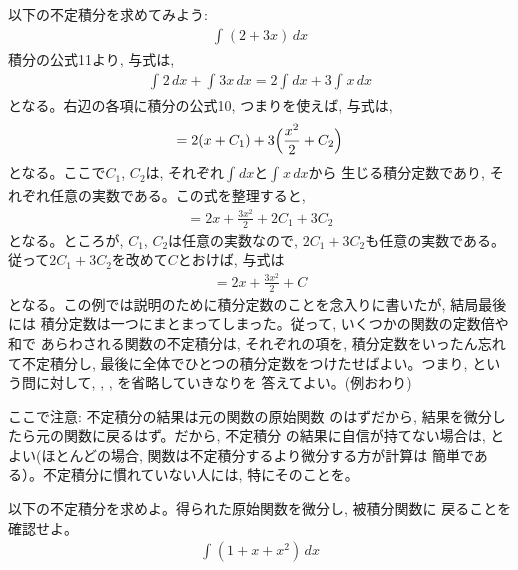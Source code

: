 \begin{exmpl} 以下の不定積分を求めてみよう:
\begin{eqnarray}\int_{}^{} (2+3x)\, dx\label{eq:exmpl_futeisekibun1}\end{eqnarray}
積分の公式11より, 与式は, 
\begin{eqnarray}
\int_{}^{} 2\,dx+\int_{}^{} 3x\,dx=2\int_{}^{} dx+3\int_{}^{} x\,dx\label{eq:exmpl_futeisekibun20_01}
\end{eqnarray}
となる。右辺の各項に積分の公式10, つまりを使えば, 与式は, 
\begin{eqnarray}
=2(x+C_1)+3\Bigl(\frac{x^2}{2}+C_2\Bigr)\label{eq:exmpl_futeisekibun20_02}
\end{eqnarray}
となる。ここで$C_1$, $C_2$は, それぞれ$\int_{}^{} dx$と$\int_{}^{} x\,dx$から
生じる積分定数であり, それぞれ任意の実数である。この式を整理すると, 
\begin{eqnarray}
=2x+\frac{3x^2}{2}+2C_1+3C_2\label{eq:exmpl_futeisekibun20}
\end{eqnarray}
となる。ところが, $C_1$, $C_2$は任意の実数なので, $2C_1+3C_2$も任意の実数である。
従って$2C_1+3C_2$を改めて$C$とおけば, 与式は
\begin{eqnarray}
=2x+\frac{3x^2}{2}+C\label{eq:exmpl_futeisekibun2}
\end{eqnarray}
となる。この例では説明のために積分定数のことを念入りに書いたが, 結局最後には
積分定数は一つにまとまってしまった。従って, いくつかの関数の定数倍や和で
あらわされる関数の不定積分は, それぞれの項を, 積分定数をいったん忘れて不定積分し, 
最後に全体でひとつの積分定数をつけたせばよい。つまり, 
という問に対して, , , 
を省略していきなりを
答えてよい。(例おわり)
\end{exmpl}
\mv

ここで注意: 不定積分の結果は元の関数の原始関数
のはずだから, 結果を微分したら元の関数に戻るはず。だから, 不定積分
の結果に自信が持てない場合は, とよい(ほとんどの場合, 関数は不定積分するより微分する方が計算は
簡単である）。不定積分に慣れていない人には, 特にそのことを。\hv

\begin{q}\label{q:int_2} 以下の不定積分を求めよ。得られた原始関数を微分し, 被積分関数に
戻ることを確認せよ。
\begin{eqnarray}\int_{}^{} (1+x+x^2)\, dx\end{eqnarray}
\end{q}
\mv


